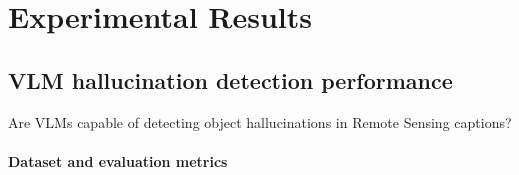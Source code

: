 \chapter{Experimental Results\label{cha:chapter5}}
\section{VLM hallucination detection performance}

\begin{formal}
	Are VLMs capable of detecting object hallucinations in Remote Sensing captions?
\end{formal}

\subsubsection{Dataset and evaluation metrics}

